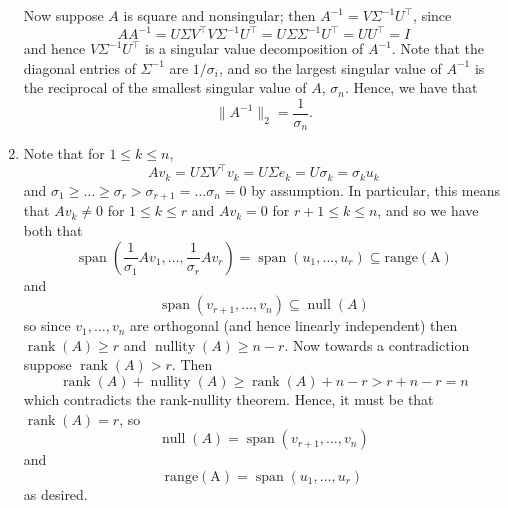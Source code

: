 \documentclass{../../../kin_math}
\begin{document}
\begin{questions}
\begin{solution}
\begin{enumerate}[label=(\arabic*)]
      Now suppose $A$ is square and nonsingular; then $A^{-1} = V \Sigma^{-1} U^\top$, since
      \begin{equation*}
        AA^{-1} = U \Sigma V^\top V \Sigma^{-1} U^\top = U \Sigma \Sigma^{-1} U^\top = U U^\top = I
      \end{equation*}
      and hence $V \Sigma^{-1} U^\top$ is a singular value decomposition of $A^{-1}$. Note that the diagonal entries of $\Sigma^{-1}$ are $1 / \sigma_i$, and so the largest singular value of $A^{-1}$ is the reciprocal of the smallest singular value of $A$, $\sigma_n$. Hence, we have that
      \begin{equation*}
        \lVert A^{-1} \rVert_2 = \frac{1}{\sigma_n}.
      \end{equation*}
      \item Note that for $1 \leq k \leq n$,
      \begin{equation*}
        A v_k = U \Sigma V^\top v_k = U \Sigma e_k = U \sigma_k = \sigma_k u_k
      \end{equation*}
      and $\sigma_1 \geq \dots \geq \sigma_r > \sigma_{r + 1} = \dots \sigma_n = 0$ by assumption. In particular, this means that $A v_k \neq 0$ for $1 \leq k \leq r$ and $A v_k = 0$ for $r + 1 \leq k \leq n$, and so we have both that
      \begin{equation*}
        \operatorname{span}\left(\frac{1}{\sigma_1} Av_1, \dots, \frac{1}{\sigma_r} Av_r\right) = \operatorname{span}(u_1, \dots, u_r) \subseteq \operatorname{range(A)}
      \end{equation*}
      and
      \begin{equation*}
        \operatorname{span}(v_{r + 1}, \dots, v_n) \subseteq \operatorname{null}(A)
      \end{equation*}
      so since $v_1, \dots, v_n$ are orthogonal (and hence linearly independent) then $\operatorname{rank}(A) \geq r$ and $\operatorname{nullity}(A) \geq n - r$. Now towards a contradiction suppose $\operatorname{rank}(A) > r$. Then
      \begin{equation*}
        \operatorname{rank}(A) + \operatorname{nullity}(A) \geq \operatorname{rank}(A) + n - r > r + n - r = n
      \end{equation*}
      which contradicts the rank-nullity theorem. Hence, it must be that $\operatorname{rank}(A) = r$, so
      \begin{equation*}
        \operatorname{null}(A) = \operatorname{span}(v_{r + 1}, \dots, v_n)
      \end{equation*}
      and
      \begin{equation*}
        \operatorname{range(A)} = \operatorname{span}(u_1, \dots, u_r)
      \end{equation*}
      as desired.
    \end{enumerate}
  \end{solution}


\end{questions}
\end{document}
